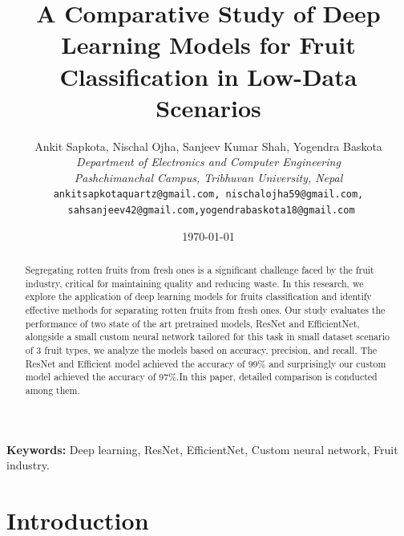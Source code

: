 \documentclass[11pt]{article}
\title{\textbf{A Comparative Study of Deep Learning Models for Fruit Classification in Low-Data Scenarios}}
\author{
    Ankit Sapkota, Nischal Ojha, Sanjeev Kumar Shah, Yogendra Baskota \\[6pt]
    \textit{Department of Electronics and Computer Engineering} \\ 
    \textit{Pashchimanchal Campus, Tribhuvan University, Nepal} \\[6pt]
    \texttt{ankitsapkotaquartz@gmail.com, nischalojha59@gmail.com,} \\[6pt]
    \texttt{ sahsanjeev42@gmail.com,yogendrabaskota18@gmail.com} \\[6pt]
}
\date{\today}
\begin{document}
\maketitle
\thispagestyle{empty}  %

\renewcommand{\abstractname}{\Large Abstract}

\begin{abstract}
\vspace{8pt}
 Segregating rotten fruits from fresh ones is a significant challenge faced by the fruit industry, critical for maintaining quality and reducing waste. In this research, we explore the application of deep learning models for fruits classification and identify effective methods for separating rotten fruits from fresh ones. Our study evaluates the performance of two state of the art pretrained models, ResNet and EfficientNet, alongside a small custom neural network tailored for this task in small dataset scenario of 3 fruit types, we analyze the models based on accuracy, precision, and recall. The ResNet and Efficient model achieved the accuracy of 99\% and surprisingly our custom model achieved the accuracy of 97\%.In this paper, detailed comparison is conducted among them. \cite{paper1}
\end{abstract}


\noindent \textbf{Keywords:} Deep learning, ResNet, EfficientNet, Custom neural network, Fruit industry.



\section{Introduction}

\end{document}
